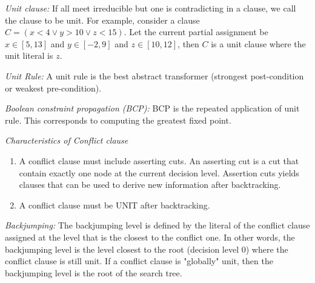 \textit{Unit clause:}
If all meet irreducible but one is contradicting in a clause, we call the clause
to be unit. For example, consider a clause $C=(x<4 \vee y>10 \vee z<15)$. Let the 
current partial assignment be $x \in [5,13]$ and $y \in [-2,9]$ and $z \in
[10,12]$, then $C$ is a unit clause where the unit literal is $z$. 

\textit{Unit Rule:} A unit rule is the best abstract transformer 
(strongest post-condition or weakest pre-condition). 

\textit{Boolean constraint propagation (BCP):} BCP is the repeated 
application of unit rule. This corresponds to computing the greatest fixed point.

\textit{Characteristics of Conflict clause}
\begin{enumerate}
\item A conflict clause must include asserting cuts. An asserting cut is a cut
that contain exactly one node at the current decision level. Assertion cuts yields 
clauses that can be used to derive new information after backtracking.

\item A conflict clause must be UNIT after backtracking. 


\end{enumerate}

\textit{Backjumping:}
The backjumping level is defined by the literal of the conflict clause assigned
at the level that is the closest to the conflict one. In other words, the
backjumping level is the level closest to the root (decision level 0)  where the
conflict clause is still unit. If a conflict clause is "globally"  unit, then
the backjumping level is the root of the search tree.
